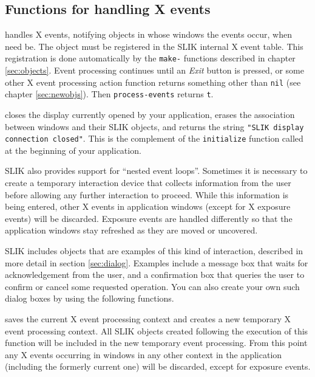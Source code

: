\documentclass[twoside,openright,11pt]{report}
\newcommand{\tp}[1]{\texttt{#1}}
\begin{document}
\subsection{Functions for handling X events}

{handles X events, notifying objects in whose windows the events
occur, when need be.  The object must be registered in the SLIK
internal X event table.  This registration is done automatically by
the \tp{make-} functions described in chapter \ref{sec:objects}.
Event processing continues until an \emph{Exit} button is pressed, or
some other X event processing action function returns something other
than \tp{nil} (see chapter \ref{sec:newobjs}).  Then
\tp{process-events} returns \tp{t}.}

{closes the display currently opened by your application, erases the
association between windows and their SLIK objects, and returns the
string \tp{"SLIK display connection closed"}.  This is the complement
of the \tp{initialize} function called at the beginning of your
application.}

SLIK also provides support for ``nested event loops''.  Sometimes it
is necessary to create a temporary interaction device that collects
information from the user before allowing any further interaction to
proceed.  While this information is being entered, other X events in
application windows (except for X exposure events) will be discarded.
Exposure events are handled differently so that the application
windows stay refreshed as they are moved or uncovered.

SLIK includes objects that are examples of this kind of interaction,
described in more detail in section \ref{sec:dialog}.  Examples
include a message box that waits for acknowledgement from the user,
and a confirmation box that queries the user to confirm or cancel some
requested operation.  You can also create your own such dialog boxes
by using the following functions.

{saves the current X event processing context and creates a new
temporary X event processing context.  All SLIK objects created
following the execution of this function will be included in the new
temporary event processing.  From this point any X events occurring in
windows in any other context in the application (including the
formerly current one) will be discarded, except for exposure events.}
\end{document}
